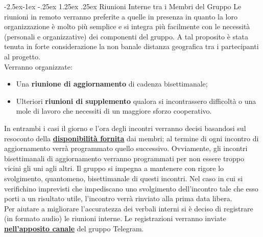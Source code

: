 \documentclass[a4paper,12pt]{article}
\makeatletter
\renewcommand\paragraph{\@startsection{paragraph}{4}{\z@}%
            {-2.5ex\@plus -1ex \@minus -.25ex}%
            {1.25ex \@plus .25ex}%
            {\normalfont\normalsize\bfseries}}
\makeatother
\begin{document}
            \paragraph{Riunioni Interne tra i Membri del Gruppo} \label{subsec:riunioniInterne}
                Le riunioni in remoto verranno preferite a quelle in presenza in quanto la loro organizzazione è molto più semplice e si integra più facilmente con le necessità (personali e organizzative) dei componenti del gruppo.
                A tal proposito è stata tenuta in forte considerazione la non banale distanza geografica tra i partecipanti al progetto. \\
                Verranno organizzate:
                \begin{itemize}
                    \item Una \textbf{riunione di aggiornamento} di cadenza bisettimanale;
                    \item Ulteriori \textbf{riunioni di supplemento} qualora si incontrassero difficoltà o una mole di lavoro che necessiti di un maggiore sforzo cooperativo.
                \end{itemize}
                In entrambi i casi il giorno e l'ora degli incontri verranno decisi basandosi sul resoconto della \textbf{\underline{\hyperref[sec:pianificazioneImpegni]{disponibilità fornita}}} dai membri; al termine di ogni incontro di aggiornamento verrà programmato quello successivo.
                Ovviamente, gli incontri bisettimanali di aggiornamento verranno programmati per non essere troppo vicini gli uni agli altri.
                Il gruppo si impegna a mantenere con rigore lo svolgimento, quantomeno, bisettimanale di questi incontri.
                Nel caso in cui si verifichino imprevisti che impediscano uno svolgimento dell'incontro tale che esso porti a un risultato utile, l'incontro verrà rinviato alla prima data libera.\\
                Per aiutare a migliorare l'accuratezza dei verbali interni si è deciso di registrare (in formato audio) le riunioni interne.
                Le registrazioni verranno inviate \textbf{\underline{\hyperref[sec:canaliTelegram]{nell'apposito canale}}} del gruppo Telegram.
            
\end{document}
